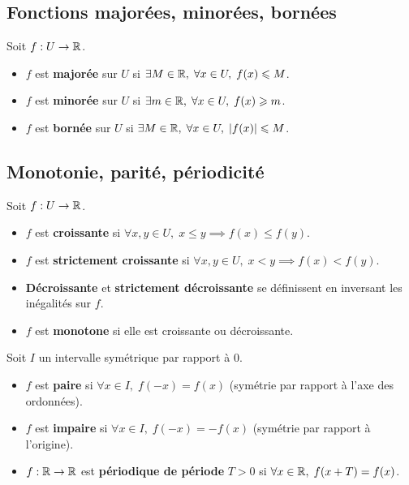 \subsection{Fonctions majorées, minorées, bornées}

\begin{defbox}
Soit $f : U \to \mathbb{R}$.
\begin{itemize}[leftmargin=1cm]
  \item $f$ est \textbf{majorée} sur $U$ si $\exists M \in \mathbb{R}, \; \forall x \in U, \; f(x) \leqslant M$.
  \item $f$ est \textbf{minorée} sur $U$ si $\exists m \in \mathbb{R}, \; \forall x \in U, \; f(x) \geqslant m$.
  \item $f$ est \textbf{bornée} sur $U$ si $\exists M \in \mathbb{R}, \; \forall x \in U, \; |f(x)| \leqslant M$.
\end{itemize}
\end{defbox}

\subsection{Monotonie, parité, périodicité}

\begin{defbox}[--- Monotonie]
Soit $f : U \to \mathbb{R}$.
\begin{itemize}[leftmargin=1cm]
  \item $f$ est \textbf{croissante} si $\forall x, y \in U, \; x \leqslant y \implies f(x) \leqslant f(y)$.
  \item $f$ est \textbf{strictement croissante} si $\forall x, y \in U, \; x < y \implies f(x) < f(y)$.
  \item \textbf{Décroissante} et \textbf{strictement décroissante} se définissent en inversant les inégalités sur $f$.
  \item $f$ est \textbf{monotone} si elle est croissante ou décroissante.
\end{itemize}
\end{defbox}

\begin{defbox}
Soit $I$ un intervalle symétrique par rapport à $0$.
\begin{itemize}[leftmargin=1cm]
  \item $f$ est \textbf{paire} si $\forall x \in I, \; f(-x) = f(x)$ (symétrie par rapport à l'axe des ordonnées).
  \item $f$ est \textbf{impaire} si $\forall x \in I, \; f(-x) = -f(x)$ (symétrie par rapport à l'origine).
  \item $f : \mathbb{R} \to \mathbb{R}$ est \textbf{périodique de période} $T > 0$ si $\forall x \in \mathbb{R}, \; f(x + T) = f(x)$.
\end{itemize}
\end{defbox}

